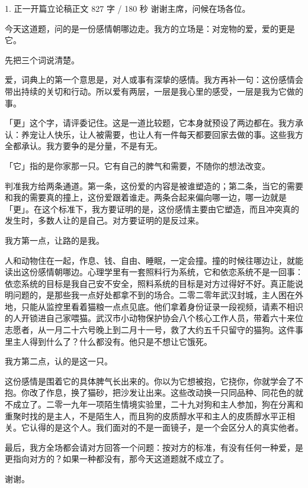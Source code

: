 \documentclass[script,pro]{debate}
\begin{document}
\debatetitle
\begin{speech}{1. 正一开篇立论稿}{正文 827 字 / 180 秒}
谢谢主席，问候在场各位。

今天这道题，问的是一份感情朝哪边走。我方的立场是：对宠物的爱，爱的更是它。

先把三个词说清楚。

爱，词典上的第一个意思是，对人或事有深挚的感情。我方再补一句：这份感情会带出持续的关切和行动。所以爱有两层，一层是我心里的感受，一层是我为它做的事。

「更」这个字，请评委记住。这是一道比较题，它本身就预设了两边都在。我方承认：养宠让人快乐，让人被需要，也让人有一件每天都要回家去做的事。这些我方全都承认。我方要争的是分量，不是有无。

「它」指的是你家那一只。它有自己的脾气和需要，不随你的想法改变。

判准我方给两条通道。第一条，这份爱的内容是被谁塑造的；第二条，当它的需要和我的需要真的撞上，这份爱跟着谁走。两条合起来偏向哪一边，哪一边就是「更」。在这个标准下，我方要证明的是，这份感情主要由它塑造，而且冲突真的发生时，多数人让的是自己。对方要证明的是反过来。

我方第一点，让路的是我。

人和动物住在一起，作息、钱、自由、睡眠，一定会撞。撞的时候往哪边让，就能读出这份感情朝哪边。心理学里有一套照料行为系统，它和依恋系统不是一回事：依恋系统的目标是我自己安不安全，照料系统的目标是对方过得好不好。真正能说明问题的，是那些我一点好处都拿不到的场合。二零二零年武汉封城，主人困在外地，只能从监控里看着猫粮一点点见底。他们拿着身份证录一段视频，请素不相识的人开锁进自己家喂猫。武汉市小动物保护协会八个核心工作人员，带着六十来位志愿者，从一月二十六号晚上到二月十一号，救了大约五千只留守的猫狗。这件事里主人得到什么了？什么都没有。他只是不想让它饿死。

我方第二点，认的是这一只。

这份感情是围着它的具体脾气长出来的。你以为它想被抱，它挠你，你就学会了不抱。你改了作息，换了猫砂，把沙发让出来。这些改动换一只同品种、同花色的就不成立了。二零一九年一项陌生情境实验里，二十九对狗和主人参加，狗在分离和重聚时找的是主人，不是陌生人，而且狗的皮质醇水平和主人的皮质醇水平正相关。它认得的是这个人。我们面对的不是一面镜子，是一个会区分人的真实他者。

最后，我方全场都会请对方回答一个问题：按对方的标准，有没有任何一种爱，是更指向对方的？如果一种都没有，那今天这道题就不成立了。

谢谢。

\begin{contingency}
\end{contingency}
\end{speech}
\end{document}
